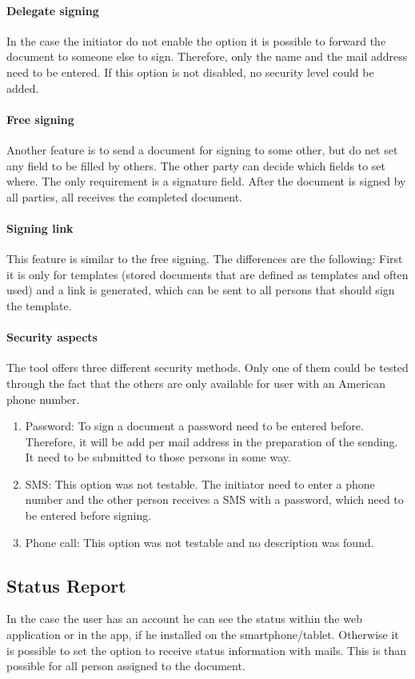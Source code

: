\paragraph{Delegate signing}
In the case the initiator do not enable the option it is possible to forward the document to someone else to sign. Therefore, only the name and the mail address need to be entered. If this option is not disabled, no security level could be added.

\paragraph{Free signing}
Another feature is to send a document for signing to some other, but do net set any field to be filled by others. The other party can decide which fields to set where. The only requirement is a signature field. After the document is signed by all parties, all receives the completed document.

\paragraph{Signing link}
This feature is similar to the free signing. The differences are the following: First it is only for templates (stored documents that are defined as templates and often used) and a link is generated, which can be sent to all persons that should sign the template.

\paragraph{Security aspects}
The tool offers three different security methods. Only one of them could be tested through the fact that the others are only available for user with an American phone number.
\begin{enumerate}
	\item Password: To sign a document a password need to be entered before. Therefore, it will be add per mail address in the preparation of the sending. It need to be submitted to those persons in some way.
	\item SMS: This option was not testable. The initiator need to enter a phone number and the other person receives a SMS with a password, which need to be entered before signing.
	\item Phone call: This option was not testable and no description was found.
\end{enumerate}

\subsection{Status Report}
In the case the user has an account he can see the status within the web application or in the \gls{app}, if he installed on the smartphone/tablet. Otherwise it is possible to set the option to receive status information with mails. This is than possible for all person assigned to the document.

